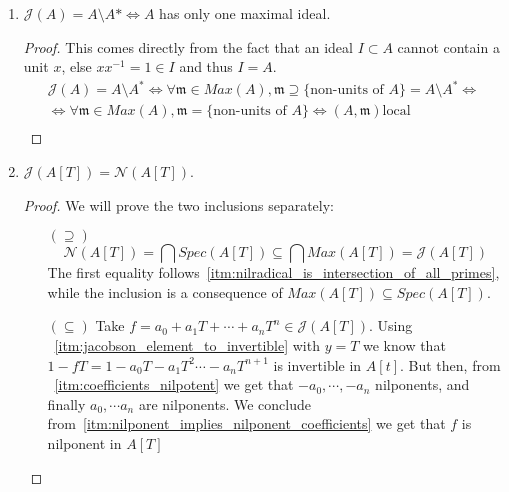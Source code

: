 \begin{problem}
\begin{enumerate}[label=(\theproblem.\arabic*),ref=\theproblem.\arabic*]
        \item $\mathcal{J}(A) = A \setminus A* \Leftrightarrow A$ has only one maximal ideal.
            \begin{sol}
                \begin{proof}
                    This comes directly from the fact that an ideal $I \subset A$ cannot contain a unit $x$, else $x x^{-1} = 1 \in I$ and thus $I = A$.
                    \begin{gather*}
                        \mathcal{J}(A) = A \setminus A^* \Leftrightarrow \forall \mathfrak{m} \in Max(A), \mathfrak{m} \supseteq \{\text{non-units of }A\} = A \setminus A^* \Leftrightarrow\\
                        \Leftrightarrow \forall \mathfrak{m} \in Max(A), \mathfrak{m} = \{\text{non-units of }A\} \Leftrightarrow (A, \mathfrak{m}) \text{local}\\
                    \end{gather*}
                \end{proof}
            \end{sol}

        \item \label{itm:nilradical_equals_jacobson_in_polynomial_ring}
        $\mathcal{J}(A[T]) = \mathcal{N}(A[T])$.
            \begin{sol}
                \begin{proof}
                We will prove the two inclusions separately:
                    \begin{itemize}
                        \item[$(\supseteq)$]
                        \[ \mathcal{N}(A[T]) = \bigcap Spec(A[T]) \subseteq \bigcap Max(A[T]) = \mathcal{J}(A[T]) \]
                        The first equality follows~\ref{itm:nilradical_is_intersection_of_all_primes}, while the inclusion is a consequence of $Max(A[T]) \subseteq Spec(A[T])$.
                        \item[$(\subseteq)$]
                        Take $f = a_0 + a_1 T + \cdots + a_n T^n \in \mathcal{J}(A[T])$.
                        Using ~\ref{itm:jacobson_element_to_invertible} with $y = T$ we know that $1 - f T = 1 - a_0 T - a_1 T^2 \cdots - a_n T^{n + 1}$ is invertible in $A[t]$.
                        But then, from ~\ref{itm:coefficients_nilpotent} we get that $-a_0, \cdots, -a_n$ nilponents, and finally $a_0, \cdots a_n$ are nilponents.
                        We conclude from~\ref{itm:nilponent_implies_nilponent_coefficients} we get that $f$ is nilponent in $A[T]$
                    \end{itemize}
                \end{proof}
            \end{sol}
    \end{enumerate}
\end{problem}

